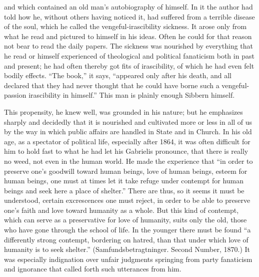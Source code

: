 \documentclass[12pt,a4paper,openany]{book}
\newcommand{\opage}[1]{\marginnote{\footnotesize\textit{[#1]}}}
\begin{document}
and which contained an old man's autobiography
of himself. In it the author had told how he,
without others having noticed it, had suffered from a
terrible disease of the soul, which he called the vengeful-irascibility sickness.
It arose only from what he read and pictured to himself in
his ideas. Often he could for that reason not bear
to read the daily papers. The sickness was nourished by everything that
he read or himself experienced of theological and political
fanaticism both in past and present; he had often thereby got
fits of irascibility, of which he had even felt bodily
effects. ``The book,'' it says, ``appeared only after his
death, and all declared that they had never thought that he
\opage{73}could have borne such a vengeful-passion irascibility in himself.''
This man is plainly enough Sibbern himself.

This propensity, he knew well, was grounded in his nature;
but he emphasizes sharply and decidedly that it is nourished and cultivated
more or less in all of us by the way in which public affairs
are handled in State and in Church. In his
old age, as a spectator of political life, especially after
1864, it was often difficult for him to hold fast to what
he had let his Gabrielis pronounce, that there is really no
weed, not even in the human world. He made
the experience that ``in order to preserve one's goodwill toward human beings,
love of human beings, esteem for human beings, one must at times let it
take refuge under contempt for human beings and seek here a
place of shelter.'' There are thus, so it seems it must be
understood, certain excrescences one must reject, in order to be able
to preserve one's faith and love toward humanity as a whole.
But this kind of contempt, which can serve as a
preservative for love of humanity, suits only the old,
those who have gone through the school of life. In the younger
there must be found ``a differently strong contempt, bordering on hatred,
than that under which love of humanity is to seek
shelter.'' (Samfundsbetragtninger. Second Number, 1870.) It was
especially indignation over unfair judgments springing from party fanaticism and
ignorance that called forth such utterances
from him.
\end{document}
